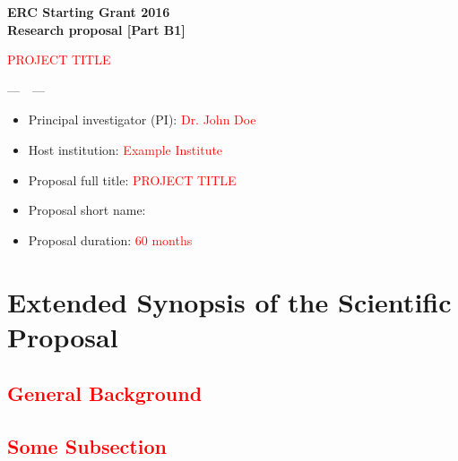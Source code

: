 
\addtocounter{chapter}{1}




\vspace*{1cm}

\begin{center}
\LARGE{\textbf{ERC Starting Grant 2016\\
Research proposal [Part B1] }
}
\vfill

\LARGE{\textsc{\textcolor{red}{PROJECT TITLE}}}

\vfill

\LARGE{\textsc{---~\acro~---}}

\vfill

\end{center}

\vfill

\begin{itemize}
\item Principal investigator (PI): \textcolor{red}{Dr. John Doe}
\item Host institution: \textcolor{red}{Example Institute}
\item{Proposal full title: \textcolor{red}{PROJECT TITLE}}
\item Proposal short name: \acro
\item Proposal duration: \textcolor{red}{60 months}
\end{itemize}
	

\vfill

\noindent
{}
\vfill


\newpage
\section{Extended Synopsis of the Scientific Proposal}

\subsection*{\textcolor{red}{General Background}}

\textcolor{red}{\blindtext[2]}


\subsection*{\textcolor{red}{Some Subsection}}

